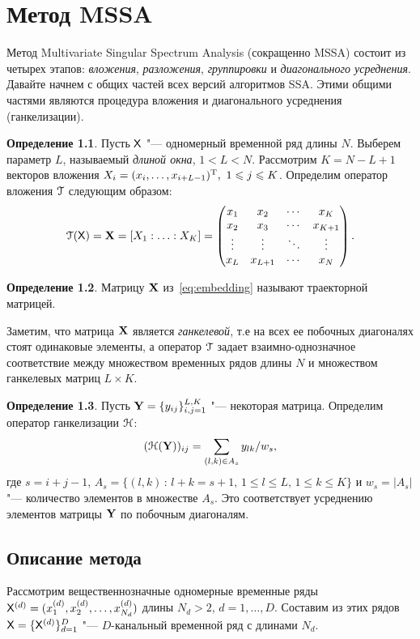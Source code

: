 \documentclass[specialist,
substylefile = spbu_report.rtx,
subf,href,colorlinks=true, 12pt]{disser}
\theoremstyle{definition}
\newtheorem{definition}{Определение}
\begin{document}
	\chapter{Метод MSSA}
	Метод Multivariate Singular Spectrum Analysis (сокращенно MSSA) состоит из четырех этапов: \emph{вложения}, \emph{разложения}, \emph{группировки} и \emph{диагонального усреднения}.
	Давайте начнем с общих частей всех версий алгоритмов SSA. Этими общими частями являются процедура вложения и диагонального усреднения (ганкелизации).
	\begin{definition}
		Пусть $\mathsf{X}$ "--- одномерный временной ряд длины $N$. Выберем параметр $L$, называемый \emph{длиной окна}, $1<L<N$. Рассмотрим $K=N-L+1$ векторов вложения $X_i=(x_{i},\ldots, x_{i+L-1})^{\mathrm{T}},\ 1\leqslant j \leqslant K$. Определим оператор вложения $\EuScript{T}$ следующим образом:
		\begin{equation}\label{eq:embedding}
			\EuScript{T}(\mathsf{X})=\mathbf{X}=[X_1:\ldots:X_K]=
			\begin{pmatrix}
				x_1 & x_2 & \cdots & x_K \\
				x_2 & x_3 & \cdots & x_{K+1} \\
				\vdots & \vdots & \ddots & \vdots \\
				x_L & x_{L+1} & \cdots & x_N 
			\end{pmatrix}.
		\end{equation}
	\end{definition}
	\begin{definition}
		Матрицу $\mathbf{X}$ из~\eqref{eq:embedding} называют траекторной матрицей.
	\end{definition}\noindent
	Заметим, что матрица $\mathbf{X}$ является \emph{ганкелевой}, т.е на всех ее побочных диагоналях стоят одинаковые элементы, а оператор $\EuScript{T}$ задает взаимно-однозначное соответствие между множеством временных рядов длины $N$ и множеством ганкелевых матриц $L\times K$.
		\begin{definition}
		Пусть $\mathbf{Y}=\{y_{ij}\}_{i,j=1}^{L,K}$ "--- некоторая матрица. Определим оператор ганкелизации $\EuScript{H}$:
		\begin{equation}\label{eq:averaging}
			(\EuScript{H}(\mathbf{Y}))_{ij}=\sum_{(l,k)\in A_s}y_{lk}/w_s,
		\end{equation}
		где $s=i+j-1$, $A_s=\{(l,k)\, :\, l+k=s+1,\, 1\leqslant l\leqslant L,\, 1\leqslant k\leqslant K\}$ и $w_s=|A_s|$ "--- количество элементов в множестве $A_s$. Это соответствует
		усреднению элементов матрицы $\mathbf{Y}$ по побочным диагоналям.
	\end{definition}
	\section{Описание метода}
	Рассмотрим вещественнозначные одномерные временные ряды $\mathsf{X}^{(d)}=(x_1^{(d)}, x_2^{(d)},\ldots, x_{N_d}^{(d)})$ длины $N_d>2$, $d=1,\ldots,D$. Составим из этих рядов $\mathsf{X}=\{\mathsf{X}^{(d)}\}_{d=1}^D$ "--- $D$-канальный временной ряд с длинами $N_d$.
\end{document}
